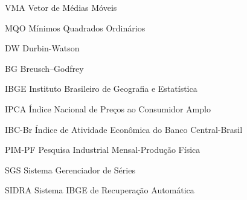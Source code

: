 \begin{siglas}
    \item[VMA] Vetor de Médias Móveis
    \item[MQO] Mínimos Quadrados Ordinários
    \item[DW] Durbin-Watson
    \item[BG] Breusch–Godfrey
	\item[IBGE] Instituto Brasileiro de Geografia e Estatística
	\item[IPCA] Índice Nacional de Preços ao Consumidor Amplo
	\item[IBC-Br] Índice de Atividade Econômica do Banco Central-Brasil
	\item[PIM-PF] Pesquisa Industrial Mensal-Produção Física
	\item[SGS] Sistema Gerenciador de Séries
	\item[SIDRA] Sistema IBGE de Recuperação Automática
\end{siglas}

